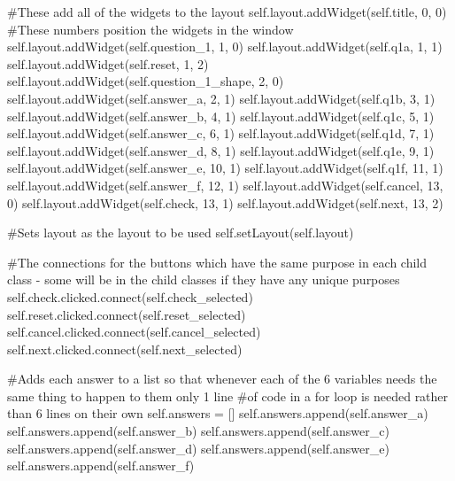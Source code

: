 \begin{landscape}
\begin{python}
        #These add all of the widgets to the layout
        self.layout.addWidget(self.title, 0, 0) #These numbers position the widgets in the window
        self.layout.addWidget(self.question_1, 1, 0)
        self.layout.addWidget(self.q1a, 1, 1)
        self.layout.addWidget(self.reset, 1, 2)
        self.layout.addWidget(self.question_1_shape, 2, 0)
        self.layout.addWidget(self.answer_a, 2, 1)
        self.layout.addWidget(self.q1b, 3, 1)
        self.layout.addWidget(self.answer_b, 4, 1)
        self.layout.addWidget(self.q1c, 5, 1)
        self.layout.addWidget(self.answer_c, 6, 1)
        self.layout.addWidget(self.q1d, 7, 1)
        self.layout.addWidget(self.answer_d, 8, 1)
        self.layout.addWidget(self.q1e, 9, 1)
        self.layout.addWidget(self.answer_e, 10, 1)
        self.layout.addWidget(self.q1f, 11, 1)
        self.layout.addWidget(self.answer_f, 12, 1)
        self.layout.addWidget(self.cancel, 13, 0)
        self.layout.addWidget(self.check, 13, 1)
        self.layout.addWidget(self.next, 13, 2)

        #Sets layout as the layout to be used
        self.setLayout(self.layout)

        #The connections for the buttons which have the same purpose in each child class - some will be in the child classes if they have any unique purposes
        self.check.clicked.connect(self.check_selected)
        self.reset.clicked.connect(self.reset_selected)
        self.cancel.clicked.connect(self.cancel_selected)
        self.next.clicked.connect(self.next_selected)

        #Adds each answer to a list so that whenever each of the 6 variables needs the same thing to happen to them only 1 line
        #of code in a for loop is needed rather than 6 lines on their own
        self.answers = []
        self.answers.append(self.answer_a)
        self.answers.append(self.answer_b)
        self.answers.append(self.answer_c)
        self.answers.append(self.answer_d)
        self.answers.append(self.answer_e)
        self.answers.append(self.answer_f)


\end{python}
\end{landscape}
